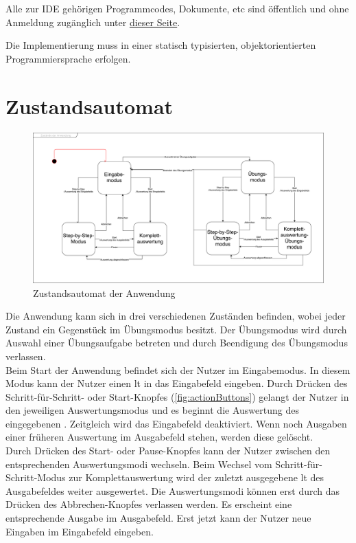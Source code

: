 \documentclass[parskip=full,11pt,twoside]{scrartcl}
\begin{document}
Alle zur IDE gehörigen Programmcodes, Dokumente, etc sind öffentlich und ohne Anmeldung zugänglich unter \href{https://github.com/wavelength-ide/wavelength-ide}{dieser Seite}.

Die Implementierung muss in einer statisch typisierten, objektorientierten Programmiersprache erfolgen.


\section{Zustandsautomat}

\begin{figure}[H]
	\centering
	\includegraphics[width=\textwidth]{img/Zustandsautomat}
	\caption{\label{fig:state} Zustandsautomat der Anwendung}
\end{figure}

Die Anwendung kann sich in drei verschiedenen Zuständen befinden, wobei jeder Zustand ein Gegenstück im Übungsmodus besitzt. 
Der Übungsmodus wird durch Auswahl einer Übungsaufgabe betreten und durch Beendigung des Übungsmodus verlassen.\\
Beim Start der Anwendung befindet sich der Nutzer im Eingabemodus. In diesem Modus kann der Nutzer einen \gls{lt} in das Eingabefeld eingeben. 
Durch Drücken des Schritt-für-Schritt- oder Start-Knopfes (\cref{fig:actionButtons}) gelangt der Nutzer in den jeweiligen Auswertungsmodus und es beginnt die Auswertung des eingegebenen . 
Zeitgleich wird das Eingabefeld deaktiviert. Wenn noch Ausgaben einer früheren Auswertung im Ausgabefeld stehen, werden diese gelöscht.\\ 
Durch Drücken des Start- oder Pause-Knopfes kann der Nutzer zwischen den entsprechenden Auswertungsmodi wechseln. 
Beim Wechsel vom Schritt-für-Schritt-Modus zur Komplettauswertung wird der zuletzt ausgegebene \gls{lt} des Ausgabefeldes weiter ausgewertet.
Die Auswertungsmodi können erst durch das Drücken des Abbrechen-Knopfes verlassen werden. Es erscheint eine entsprechende Ausgabe im Ausgabefeld. Erst jetzt kann der Nutzer neue Eingaben im Eingabefeld eingeben.
\end{document}
